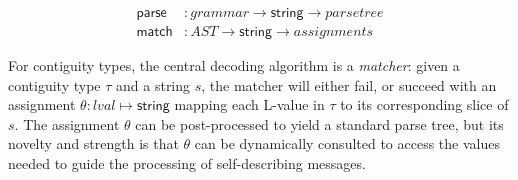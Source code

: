 \documentclass[svgnames]{llncs}
\newcommand{\konst}[1]{\ensuremath{\mathsf{#1}}}
\begin{document}
\begin{align*}
  \konst{parse} &: \mathit{grammar} \to \konst{string} \to \mathit{parse tree} \\
  \konst{match} &: \mathit{AST} \to \konst{string} \to \mathit{assignments}
\end{align*}

For contiguity types, the central decoding algorithm is a
\emph{matcher}: given a contiguity type $\tau$ and a string $s$, the
matcher will either fail, or succeed with an assignment $\theta :
\mathit{lval} \mapsto \konst{string}$ mapping each L-value in $\tau$
to its corresponding slice of $s$. The assignment $\theta$ can be
post-processed to yield a standard parse tree, but its novelty and
strength is that $\theta$ can be dynamically consulted to access the
values needed to guide the processing of self-describing messages.
\end{document}

